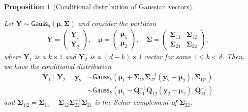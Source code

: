 \documentclass[
  11pt,
  letterpaper,
]{scrbook}
\theoremstyle{definition}
\theoremstyle{definition}
\theoremstyle{definition}
\theoremstyle{plain}
\newtheorem{proposition}{Proposition}[chapter]
\theoremstyle{plain}
\theoremstyle{remark}
\begin{document}
\begin{proposition}[Conditional distribution of Gaussian
vectors]\protect\hypertarget{prp-conditional-gaussian}{}\label{prp-conditional-gaussian}

Let
\(\boldsymbol{Y} \sim \mathsf{Gauss}_d(\boldsymbol{\mu}, \boldsymbol{\Sigma})\)
and consider the partition \begin{align*}
 \boldsymbol{Y} = \begin{pmatrix} \boldsymbol{Y}_1 \\ \boldsymbol{Y}_2\end{pmatrix}, \quad 
 \boldsymbol{\mu} = \begin{pmatrix} \boldsymbol{\mu}_1 \\ \boldsymbol{\mu}_2\end{pmatrix}, \quad 
 \boldsymbol{\Sigma} = \begin{pmatrix} \boldsymbol{\Sigma}_{11} & \boldsymbol{\Sigma}_{12}\\ \boldsymbol{\Sigma}_{21} & \boldsymbol{\Sigma}_{22}\end{pmatrix},
\end{align*} where \(\boldsymbol{Y}_1\) is a \(k \times 1\) and
\(\boldsymbol{Y}_2\) is a \((d-k) \times 1\) vector for some
\(1\leq k < d.\) Then, we have the conditional distribution
\begin{align*}
\boldsymbol{Y}_1 \mid \boldsymbol{Y}_2 =\boldsymbol{y}_2 &\sim \mathsf{Gauss}_k(\boldsymbol{\mu}_1+\boldsymbol{\Sigma}_{12} \boldsymbol{\Sigma}_{22}^{-1}(\boldsymbol{y}_2-\boldsymbol{\mu}_2), \boldsymbol{\Sigma}_{1|2})
\\& \sim  \mathsf{Gauss}_k(\boldsymbol{\mu}_1-\boldsymbol{Q}_{11}^{-1}\boldsymbol{Q}_{12}(\boldsymbol{y}_2-\boldsymbol{\mu}_2), \boldsymbol{Q}^{-1}_{11})
\end{align*} and
\(\boldsymbol{\Sigma}_{1|2}=\boldsymbol{\Sigma}_{11}-\boldsymbol{\Sigma}_{12}\boldsymbol{\Sigma}_{22}^{-1}\boldsymbol{\Sigma}_{21}\)
is the Schur complement of \(\boldsymbol{\Sigma}_{22}\).

\end{proposition}
\end{document}
